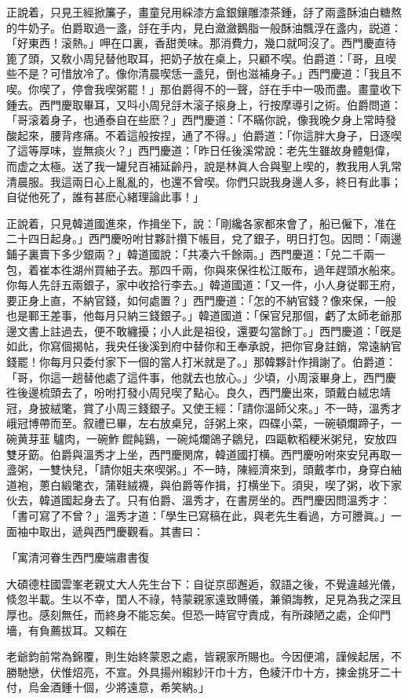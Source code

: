 正說着，只見王經掀簾子，畫童兒用綵漆方盒銀鑲雕漆茶鍾，㧱了兩盞酥油白糖熬的牛奶子。伯爵取過一盞，㧱在手内，見白瀲瀲鵝脂一般酥油飄浮在盞内，説道：「好東西！滚熱。」呷在口裏，香甜羙味。那消費力，幾口就呵沒了。西門慶直待篦了頭，又敎小周兒替他取耳，把奶子放在桌上，只顧不喫。伯爵道：「哥，且喫些不是？可惜放冷了。像你清晨喫恁一盞兒，倒也滋補身子。」西門慶道：「我且不喫。你喫了，停會我喫粥罷！」那伯爵得不的一聲，㧱在手中一吸而盡。畫童收下鍾去。西門慶取畢耳，又呌小周兒㧱木滚子㨰身上，行按摩導引之術。伯爵問道：「哥滚着身子，也通泰自在些麽？」西門慶道：「不瞞你說，像我晚夕身上常時發酸起來，腰背疼痛。不着這般按捏，通了不得。」伯爵道：「你這胖大身子，日逐喫了這等厚味，豈無痰火？」西門慶道：「昨日任後溪常說：老先生雖故身體魁偉，而虚之太極。送了我一罐兒百補延齡丹，說是林眞人合與聖上喫的，教我用人乳常清晨服。我這兩日心上亂亂的，也還不曾喫。你們只説我身邊人多，終日有此事；自従他死了，誰有甚麽心緒理論此事！」

正說着，只見韓道國進來，作揖坐下，說：「剛纔各家都來會了，船已僱下，准在二十四日起身。」西門慶吩咐甘夥計攢下帳目，兌了銀子，明日打包。因問：「兩邊鋪子裏賣下多少銀兩？」韓道國說：「共凑六千餘兩。」西門慶道：「兑二千兩一包，着崔本徃湖州買紬子去。那四千兩，你與來保徃松江販布，過年趕頭水船來。你每人先㧱五兩銀子，家中收拾行李去。」韓道國道：「又一件，小人身従鄆王府，要正身上直，不納官錢，如何處置？」西門慶道：「怎的不納官錢？像來保，一般也是鄆王差事，他每月只納三錢銀子。」韓道國道：「保官兒那個，虧了太師老爺那邊文書上註過去，便不敢纏擾；小人此是祖役，還要勾當餘丁。」西門慶道：「旣是如此，你寫個揭帖，我央任後溪到府中替你和王奉承說，把你官身註銷，常遠納官錢罷！你每月只委付家下一個的當人打米就是了。」那韓夥計作揖謝了。伯爵道：「哥，你這一趟替他處了這件事，他就去也放心。」少頃，小周滚畢身上，西門慶徃後邊梳頭去了，吩咐打發小周兒喫了點心。良久，西門慶出來，頭戴白絨忠靖冠，身披絨氅，賞了小周三錢銀子。又使王經：「請你溫師父來。」不一時，溫秀才峨冠博帶而至。叙禮已畢，左右放桌兒，㧱粥上來，四碟小菜，一碗頓爛蹄子，一碗黄芽韮𤆑驢肉，一碗鮓𤆑餛飩鷄，一碗炖爛鴿子鶵兒，四甌軟稻粳米粥兒，安放四雙牙筯。伯爵與溫秀才上坐，西門慶関席，韓道國打横。西門慶吩咐來安兒再取一盞粥，一雙快兒，「請你姐夫來喫粥。」不一時，陳經濟來到，頭戴孝巾，身穿白紬道袍，蔥白緞氅衣，蒲鞋絨襪，與伯爵等作揖，打横坐下。須臾，喫了粥，收下家伙去，韓道國起身去了。只有伯爵、溫秀才，在書房坐的。西門慶因問溫秀才：「書可寫了不曾？」溫秀才道：「學生已寫稿在此，與老先生看過，方可謄眞。」一面袖中取出，遞與西門慶觀看。其書曰：

\begin{myquote}[\markfont]
\hspace*{4em}「寓清河眷生西門慶端肅書復

大碩德柱國雲峯老親丈大人先生台下：自従京邸邂逅，叙語之後，不覺違越光儀，倐忽半載。生以不幸，閨人不祿，特蒙親家遠致賻儀，兼領誨教，足見為我之深且厚也。感刻無任，而終身不能忘矣。但恐一時官守責成，有所疎陋之處，企仰門墻，有負薦拔耳。又賴在

老爺鈞前常為錦覆，則生始終蒙恩之處，皆親家所賜也。今因便鴻，謹候起居，不勝馳戀，伏惟炤亮，不宣。外具揚州縐紗汗巾十方，色綾汗巾十方，揀金挑牙二十付，烏金酒鍾十個，少將遠意，希笑納。」
\end{myquote}

